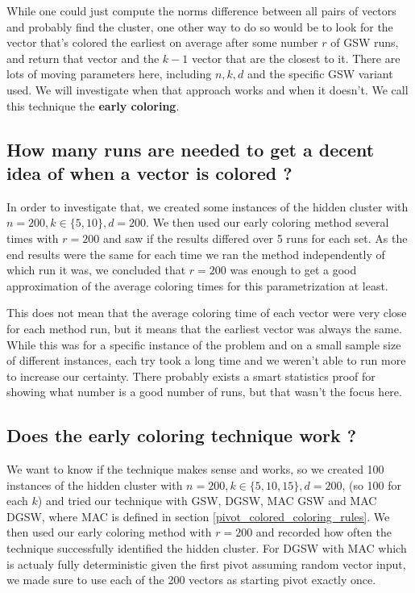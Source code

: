 \documentclass[12pt]{article}
\begin{document}
While one could just compute the norms difference between all pairs of vectors and probably find the cluster, one other way to do so would be to look for the vector that's colored the earliest on average after some number $r$ of GSW runs, and return that vector and the $k-1$ vector that are the closest to it. There are lots of moving parameters here, including $n,k,d$ and the specific GSW variant used. We will investigate when that approach works and when it doesn't. We call this technique the \textbf{early coloring}.

\subsection{How many runs are needed to get a decent idea of when a vector is colored ?}
In order to investigate that, we created some instances of the hidden cluster with $n=200,k\in\{5,10\},d=200$. We then used our early coloring method several times with $r=200$ and saw if the results differed over 5 runs for each set. As the end results were the same for each time we ran the method independently of which run it was, we concluded that $r=200$ was enough to get a good approximation of the average coloring times for this parametrization at least.

This does not mean that the average coloring time of each vector were very close for each method run, but it means that the earliest vector was always the same. While this was for a specific instance of the problem and on a small sample size of different instances, each try took a long time and we weren't able to run more to increase our certainty. There probably exists a smart statistics proof for showing what number is a good number of runs, but that wasn't the focus here.

\subsection{Does the early coloring technique work ?}\label{early_work}
We want to know if the technique makes sense and works, so we created 100 instances of the hidden cluster with $n=200,k\in\{5,10,15\},d=200$, (so 100 for each $k$) and tried our technique with GSW, DGSW, MAC GSW and MAC DGSW, where MAC is defined in section \ref{pivot_colored_coloring_rules}. We then used our early coloring method with $r=200$ and recorded how often the technique successfully identified the hidden cluster. For DGSW with MAC which is actualy fully deterministic given the first pivot assuming random vector input, we made sure to use each of the 200 vectors as starting pivot exactly once.
\end{document}
